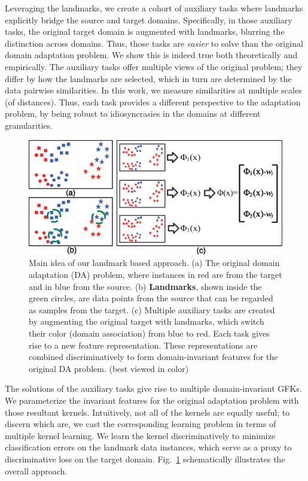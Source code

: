 Leveraging the landmarks, we create a cohort of auxiliary tasks where landmarks explicitly bridge the source and target domains. Specifically, in those auxiliary tasks, the original target domain is augmented with landmarks, blurring the distinction across domains. Thus, those tasks are \emph{easier} to solve than the original domain adaptation problem. We show this is indeed true both theoretically and empirically. The auxiliary tasks offer multiple views of the original problem; they differ by how the landmarks are selected, which in turn are determined by the data pairwise similarities. In this work, we measure similarities at multiple scales (of distances). Thus, each task provides a different perspective to the adaptation problem, by being robust to idiosyncrasies in the domains at different granularities.


\begin{figure}[t]
\centering
\includegraphics[width=0.8\columnwidth]{fig/fConcept1}
\caption{Main idea of our landmark based approach. (a) The original domain adaptation (DA) problem, where instances in red are from the target and in blue from the source. (b) \textbf{Landmarks}, shown inside the green circles, are data points from the source that can be regarded as samples from the target. (c) Multiple auxiliary tasks are created by augmenting the original target with landmarks, which switch their color (domain association) from blue to red. Each task gives rise to a new feature representation.  These representations are combined discriminatively to form domain-invariant features for the original DA problem. (best viewed in color)}
\label{fConcept}
\end{figure}


The solutions of the auxiliary tasks give rise to multiple domain-invariant GFKs. We parameterize the invariant features for the original adaptation problem with those resultant kernels.  Intuitively, not all of the kernels are equally useful; to discern which are, we cast the corresponding  learning problem in terms of multiple kernel learning.  We learn the kernel discriminatively to  minimize classification errors on the landmark data instances, which serve as a proxy to discriminative loss on the target domain. Fig.~\ref{fConcept} schematically illustrates the overall approach.

